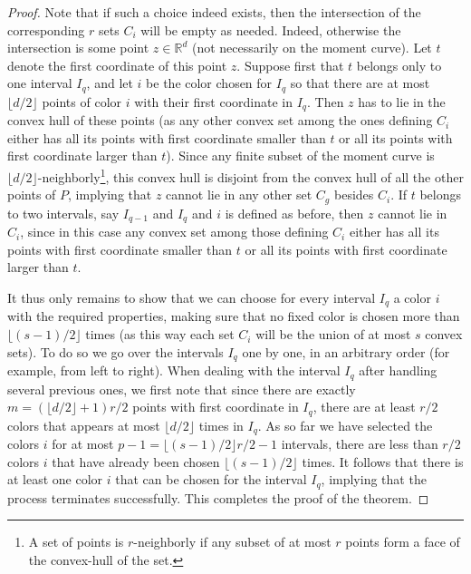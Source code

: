 \documentclass[11pt]{article}
\theoremstyle{plain}
\theoremstyle{definition}
\theoremstyle{remark}
\begin{document}
\begin{proof}
Note that if such
a choice indeed exists, then the intersection of the corresponding 
$r$ sets $C_i$ will be empty as needed. Indeed, otherwise the
intersection is some point $z \in \mathbb{R}^d$ (not necessarily on
the moment curve). Let $t$ denote the first coordinate of this
point $z$. Suppose first that $t$ 
belongs only to one interval $I_q$, and let
$i$ be the color chosen for $I_q$ 
so that there are at most $\lfloor d/2 \rfloor$
points of color $i$ with their first coordinate in  $I_q$. 
Then $z$ has to lie in the convex hull of these points (as any
other convex set among the ones defining 
$C_i$ either has all its points with
first coordinate smaller than $t$ or all its points with 
first coordinate larger than $t$). Since any finite subset of the moment curve is
$\lfloor d/2 \rfloor$-neighborly\footnote{A set of points is $r$-neighborly if any subset of at most $r$ points form a face of the convex-hull of the set.}, this convex hull is disjoint from
the convex hull of all the other points of $P$, implying that
$z$ cannot lie in any other set $C_g$ besides $C_i$. If $t$ belongs
to two intervals, say $I_{q-1}$ and $I_q$  and $i$ is defined as
before, then $z$ cannot lie in $C_i$, since in this case any convex
set among those defining $C_i$
either has all its points with
first coordinate smaller than $t$ or all its points with 
first coordinate larger than $t$. 

It thus only remains to show that we can choose for every interval
$I_q$ a color $i$ with the required properties, making sure that no
fixed color is chosen more than $\lfloor (s-1)/2 \rfloor$ times
(as this way each set $C_i$ will be the union of at most $s$ convex 
sets). To do so we go over the intervals $I_q$ one by one, in an
arbitrary order (for example, from left to right). When dealing
with the interval $I_q$ after handling several previous ones, we
first note that since there are exactly 
$m=(\lfloor d/2 \rfloor+1)r/2$ 
points with first coordinate in $I_q$, there are at
least $r/2$ colors that appears at most 
$\lfloor d/2 \rfloor$ times in $I_q$. As so far we have selected the
colors $i$ for at most $p-1=\lfloor(s-1)/2 \rfloor r/2 -1$
intervals, there are less than $r/2$ colors $i$ that have already
been chosen $\lfloor(s-1)/2 \rfloor $ times. It follows that
there is at least one color $i$ that can be chosen for the interval
$I_q$, implying that the process terminates successfully. This
completes the proof of the theorem.
\end{proof}
\end{document}
